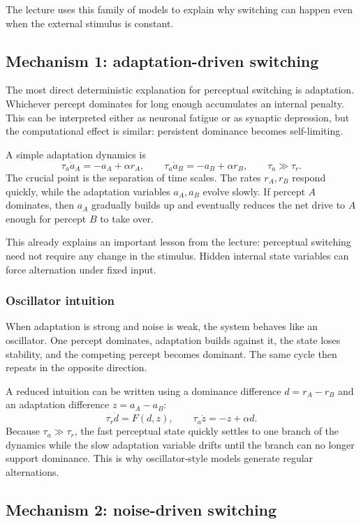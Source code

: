 The lecture uses this family of models to explain why switching can happen even when the external stimulus is constant.

\subsection{Mechanism 1: adaptation-driven switching}

The most direct deterministic explanation for perceptual switching is adaptation. Whichever percept dominates for long enough accumulates an internal penalty. This can be interpreted either as neuronal fatigue or as synaptic depression, but the computational effect is similar: persistent dominance becomes self-limiting.

A simple adaptation dynamics is
\[
\tau_a \dot a_A = -a_A + \alpha r_A,
\qquad
\tau_a \dot a_B = -a_B + \alpha r_B,
\qquad
\tau_a \gg \tau_r.
\]
The crucial point is the separation of time scales. The rates \(r_A,r_B\) respond quickly, while the adaptation variables \(a_A,a_B\) evolve slowly. If percept \(A\) dominates, then \(a_A\) gradually builds up and eventually reduces the net drive to \(A\) enough for percept \(B\) to take over.

This already explains an important lesson from the lecture: perceptual switching need not require any change in the stimulus. Hidden internal state variables can force alternation under fixed input.

\subsubsection{Oscillator intuition}

When adaptation is strong and noise is weak, the system behaves like an oscillator. One percept dominates, adaptation builds against it, the state loses stability, and the competing percept becomes dominant. The same cycle then repeats in the opposite direction.

A reduced intuition can be written using a dominance difference \(d=r_A-r_B\) and an adaptation difference \(z=a_A-a_B\):
\[
\tau_r \dot d = F(d,z),
\qquad
\tau_a \dot z = -z + \alpha d.
\]
Because \(\tau_a\gg\tau_r\), the fast perceptual state quickly settles to one branch of the dynamics while the slow adaptation variable drifts until the branch can no longer support dominance. This is why oscillator-style models generate regular alternations.

\subsection{Mechanism 2: noise-driven switching}


